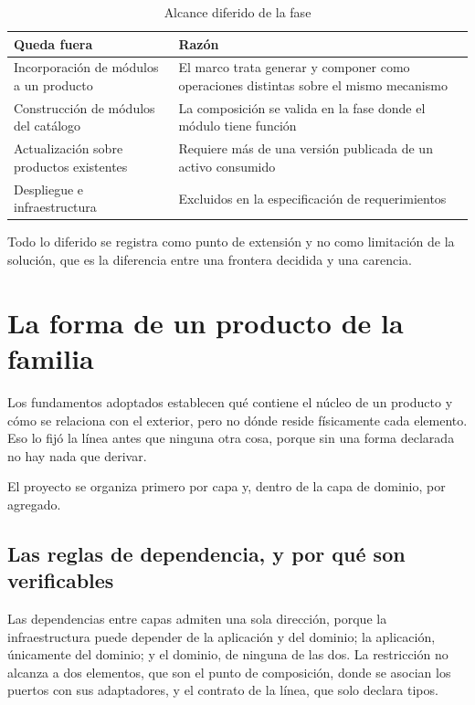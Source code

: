 \begin{table}[H]
\centering
{\footnotesize
\begin{tabular}{p{6.2cm}p{8.8cm}}
\toprule
\textbf{Queda fuera} & \textbf{Razón} \\
\midrule
Incorporación de módulos a un producto & El marco trata generar y componer como operaciones distintas sobre el mismo mecanismo \\
Construcción de módulos del catálogo & La composición se valida en la fase donde el módulo tiene función \\
Actualización sobre productos existentes & Requiere más de una versión publicada de un activo consumido \\
Despliegue e infraestructura & Excluidos en la especificación de requerimientos \\
\bottomrule
\end{tabular}
}
\caption{Alcance diferido de la fase}
\label{tab:alcance-fase-2}
\end{table}

Todo lo diferido se registra como punto de extensión y no como limitación de
la solución, que es la diferencia entre una frontera decidida y una carencia.

\section{La forma de un producto de la familia}
\label{sec:organizacion-codigo}

Los fundamentos adoptados establecen qué contiene el núcleo de un producto y
cómo se relaciona con el exterior, pero no dónde reside físicamente cada
elemento. Eso lo fijó la línea antes que ninguna otra cosa, porque sin una
forma declarada no hay nada que derivar.

El proyecto se organiza primero por capa y, dentro de la capa de dominio, por
agregado.

\subsection{Las reglas de dependencia, y por qué son verificables}

Las dependencias entre capas admiten una sola dirección, porque la
infraestructura puede depender de la aplicación y del dominio; la aplicación,
únicamente del dominio; y el dominio, de ninguna de las dos. La restricción no
alcanza a dos elementos, que son el punto de composición, donde se asocian los
puertos con sus adaptadores, y el contrato de la línea, que solo declara
tipos.

